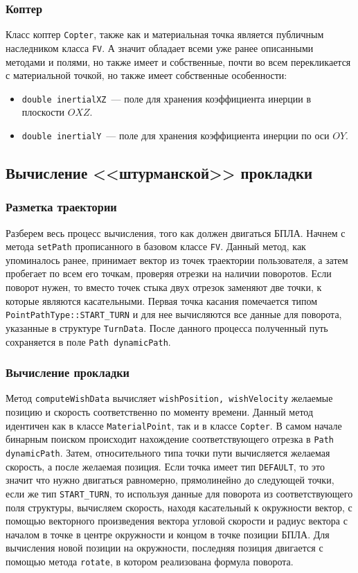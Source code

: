 \documentclass[a4paper,12pt]{article}
\begin{document}
\subsubsection{Коптер}
Класс коптер \texttt{Copter}, также как и материальная точка является публичным наследником класса \texttt{FV}. А значит обладает всеми уже ранее описанными методами и полями, но также имеет и собственные, почти во всем перекликается с материальной точкой, но также имеет собственные особенности:
\begin{itemize}
    \item \texttt{double inertialXZ}~--- поле для хранения коэффициента инерции в плоскости $OXZ$. 
    \item \texttt{double inertialY}~--- поле для хранения коэффициента инерции по оси $OY$.
\end{itemize}
\subsection{Вычисление <<штурманской>> прокладки}

\subsubsection{Разметка траектории}
Разберем весь процесс вычисления, того как должен двигаться БПЛА. 
Начнем с метода \texttt{setPath} прописанного в базовом классе \texttt{FV}.
Данный метод, как упоминалось ранее, принимает вектор из точек траектории пользователя, а затем пробегает по всем его точкам, проверяя отрезки на наличии поворотов.
Если поворот нужен, то вместо точек стыка двух отрезок заменяют две точки, к которые являются касательными. Первая точка касания помечается типом \texttt{PointPathType::START\_TURN} и для нее вычисляются все данные для поворота, указанные в структуре \texttt{TurnData}. После данного процесса полученный путь сохраняется в поле \texttt{Path dynamicPath}.

\subsubsection{Вычисление прокладки}
Метод \texttt{computeWishData} вычисляет \texttt{wishPosition, wishVelocity} желаемые позицию и скорость соответственно по моменту времени. Данный метод идентичен как в классе \texttt{MaterialPoint}, так и в классе \texttt{Copter}. В самом начале бинарным поиском происходит нахождение соответствующего отрезка в \texttt{Path dynamicPath}. Затем, относительного типа точки пути вычисляется желаемая скорость, а после желаемая позиция. Если точка имеет тип \texttt{DEFAULT}, то это значит что нужно двигаться равномерно, прямолинейно до следующей точки, если же тип \texttt{START\_TURN}, то используя данные для поворота из соответствующего поля структуры, вычисляем скорость, находя касательный к окружности вектор, с помощью векторного произведения вектора угловой скорости и радиус вектора с началом в точке в центре окружности и концом в точке позиции БПЛА. Для вычисления новой позиции на окружности, последняя позиция двигается с помощью метода \texttt{rotate}, в котором реализована формула поворота.
\end{document}
